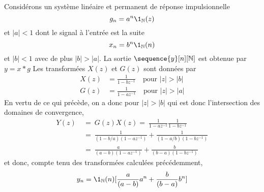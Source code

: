 \begin{proposition}
{Consid\'{e}rons un syst\`{e}me lin\'{e}aire et permanent de r\'{e}ponse impulsionnelle
\[
g_n=a^{n} \1_{\nset}(z)
\]
et $|a|<1$ dont le signal \`{a} l'entr\'{e}e est la suite
$$
x_n=b^{n} \1_{\nset}(n)
$$
et $|b|<1$ avec de plus $|b|>|a|$. La sortie $\sequence{y}[n][\nset]$ est obtenue par $y=x * g$ Les transform\'{e}es $X(z)$ et $G(z)$ sont donn\'{e}es par
\begin{align*}
X(z) &=  \frac{1}{1-bz^{-1}} \quad \text{pour $|z|>|b|$} \\
G(z) &=  \frac{1}{1-az^{-1}} \quad \text{pour $|z|>|a|$}
\end{align*}
En vertu de ce qui pr\'{e}c\`{e}de, on a donc pour $|z|>|b|$ qui est donc l'intersection des domaines de convergence,
\begin{align*}
Y(z)\ &=\ G(z)X(z) =\ \frac{1}{1-az^{-1}}\frac{1}{1-bz^{-1}}\\
&=\ \frac{1}{(1-b/a)(1-az^{-1})}+\frac{1}{(1-a/b)(1-bz^{-1})} \\
&=\ \frac{a}{(a-b)(1-az^{-1})}+\frac{b}{(b-a)(1-bz^{-1})}\
\end{align*}
et donc, compte tenu des transform\'{e}es calcul\'{e}es pr\'{e}c\'{e}demment,
$$
y_n=\1_\nset(n)[\frac{a}{(a-b)}a^{n}+\frac{b}{(b-a)}b^{n}]
$$
%
%
}
\end{proposition}
